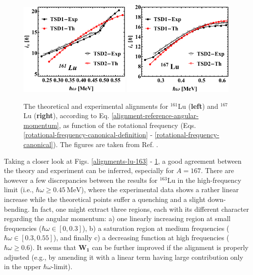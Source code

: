 \begin{figure}
    \centering
    \includegraphics[width=0.49\textwidth]{Chapters/Figures/Lu-exp-energies/fig7.pdf}
    \includegraphics[width=0.49\textwidth]{Chapters/Figures/Lu-exp-energies/fig10.pdf}
    \caption{The theoretical and experimental alignments for $^{161}$Lu (\textbf{left}) and $^{167}$Lu (\textbf{right}), according to Eq. \ref{alignment-reference-angular-momentum}, as function of the rotational frequency (Eqs. \ref{rotational-frequency-canonical-definition} - \ref{rotational-frequency-canonical}). The figures are taken from Ref. \cite{raduta2020approach}.}
    \label{alignments-lu-161-167}
\end{figure}

Taking a closer look at Figs. \ref{alignments-lu-163} - \ref{alignments-lu-161-167}, a good agreement between the theory and experiment can be inferred, especially for $A=167$. There are however a few discrepancies between the results for $^{163}$Lu in the high-frequency limit (i.e., $\hbar\omega\geq 0.45\ \text{MeV}$), where the experimental data shows a rather linear increase while the theoretical points suffer a quenching and a slight down-bending. In fact, one might extract three regions, each with its different character regarding the angular momentum: a) one linearly increasing region at small frequencies ($\hbar\omega\in[0,0.3]$), b) a saturation region at medium frequencies ($\hbar\omega\in[0.3,0.55]$), and finally c) a decreasing function at high frequencies ($\hbar\omega\geq 0.6$). It seems that $\mathbf{W_1}$ can be further improved if the alignment is properly adjusted (e.g., by amending it with a linear term having large contribution only in the upper $\hbar\omega$-limit).

